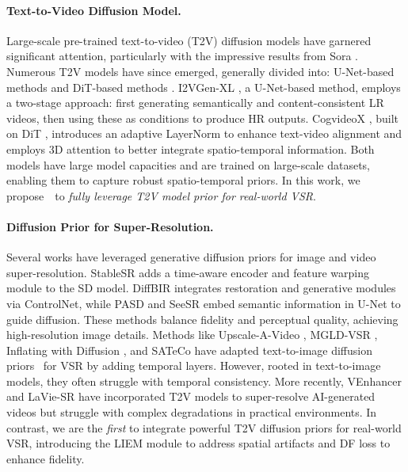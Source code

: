\vspace{-1em}
\paragraph{Text-to-Video Diffusion Model.} 
Large-scale pre-trained text-to-video (T2V) diffusion models have garnered significant attention, particularly with the impressive results from Sora \cite{videoworldsimulators2024,sora}. 
Numerous T2V models have since emerged, generally divided into: U-Net-based methods \cite{blattmann2023align, blattmann2023stable, ho2022imagen, singer2022make} and DiT-based methods \cite{yang2024cogvideox, bao2024vidu, polyak2024movie, chen2024gentron}. 
I2VGen-XL \cite{zhang2023i2vgen}, a U-Net-based method, employs a two-stage approach: first generating semantically and content-consistent LR videos, then using these as conditions to produce HR outputs.
CogvideoX \cite{yang2024cogvideox}, built on DiT \cite{peebles2023scalable}, introduces an adaptive LayerNorm to enhance text-video alignment and employs 3D attention to better integrate spatio-temporal information.
Both models %
have large model capacities and are trained on large-scale datasets, enabling them to capture robust spatio-temporal priors. 
In this work, we propose~\name~to \textit{fully leverage T2V model prior for real-world VSR}.

\vspace{-1em}
\paragraph{Diffusion Prior for Super-Resolution.}
Several works \cite{wang2024exploiting, lin2023diffbir, yang2023pixel, wu2024seesr, zhao2024wavelet} have leveraged generative diffusion priors for image and video super-resolution. 
StableSR \cite{wang2024exploiting} adds a time-aware encoder and feature warping module to the SD model. DiffBIR \cite{lin2023diffbir} integrates restoration and generative modules via ControlNet, while PASD \cite{yang2023pixel} and SeeSR \cite{wu2024seesr} embed semantic information in U-Net to guide diffusion. These methods balance fidelity and perceptual quality, achieving high-resolution image details.
Methods like Upscale-A-Video \cite{zhou2024upscale}, MGLD-VSR \cite{yang2023mgldvsr}, Inflating with Diffusion \cite{yuan2024inflation}, and SATeCo \cite{chen2024learning} have adapted text-to-image diffusion priors~\cite{rombach2022high,ho2022imagen} for VSR by adding temporal layers. However, rooted in text-to-image models, they often struggle with temporal consistency. 
More recently, VEnhancer\cite{he2024venhancer} and LaVie-SR\cite{wang2023lavie} have incorporated T2V models to super-resolve AI-generated videos but struggle with complex degradations in practical environments. 
In contrast, we are the \textit{first} to integrate powerful T2V diffusion priors for real-world VSR, introducing the LIEM module to address spatial artifacts and DF loss to enhance fidelity.